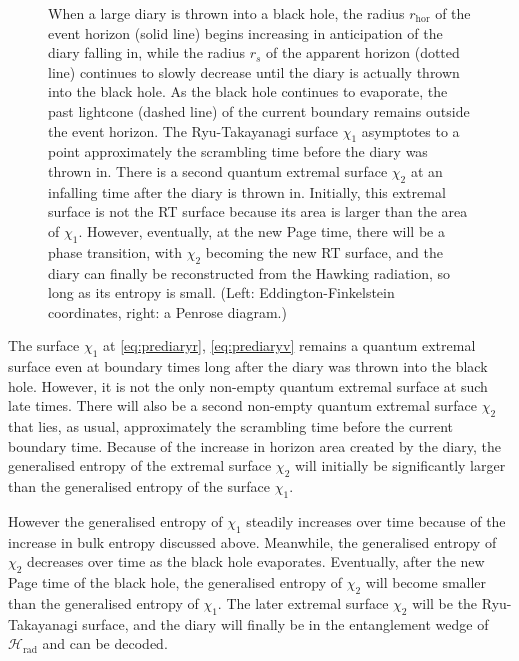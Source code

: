 \documentclass[12pt]{article}
\begin{document}
\begin{figure}[t]
\begin{subfigure}{.48\textwidth}
\end{subfigure}
\centering
\caption{When a large diary is thrown into a black hole, the radius $r_\text{hor}$ of the event horizon (solid line) begins increasing in anticipation of the diary falling in, while the radius $r_s$ of the apparent horizon (dotted line) continues to slowly decrease until the diary is actually thrown into the black hole. As the black hole continues to evaporate, the past lightcone (dashed line) of the current boundary remains outside the event horizon. The Ryu-Takayanagi surface $\chi_1$ asymptotes to a point approximately the scrambling time before the diary was thrown in. There is a second quantum extremal surface $\chi_2$ at an infalling time after the diary is thrown in. Initially, this extremal surface is not the RT surface because its area is larger than the area of $\chi_1$. However, eventually, at the new Page time, there will be a phase transition, with $\chi_2$ becoming the new RT surface, and the diary can finally be reconstructed from the Hawking radiation, so long as its entropy is small. (Left: Eddington-Finkelstein coordinates, right: a Penrose diagram.)}
\label{fig:largediary}
\end{figure}

The surface $\chi_1$ at \eqref{eq:prediaryr}, \eqref{eq:prediaryv} remains a quantum extremal surface even at boundary times long after the diary was thrown into the black hole. However, it is not the only non-empty quantum extremal surface at such late times. There will also be a second non-empty quantum extremal surface $\chi_2$ that lies, as usual, approximately the scrambling time before the current boundary time. Because of the increase in horizon area created by the diary, the generalised entropy of the extremal surface $\chi_2$ will initially be significantly larger than the generalised entropy of the surface $\chi_1$.

However the generalised entropy of $\chi_1$ steadily increases over time because of the increase in bulk entropy discussed above. Meanwhile, the generalised entropy of $\chi_2$ decreases over time as the black hole evaporates. Eventually, after the new Page time of the black hole, the generalised entropy of $\chi_2$ will become smaller than the generalised entropy of $\chi_1$. The later extremal surface $\chi_2$ will be the Ryu-Takayanagi surface, and the diary will finally be in the entanglement wedge of $\mathcal{H}_\text{rad}$ and can be decoded.
\end{document}
